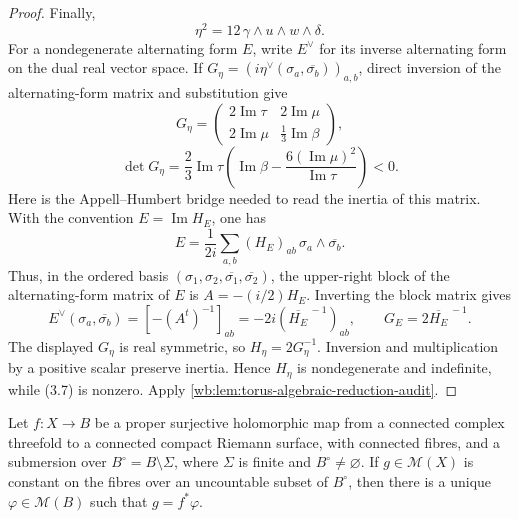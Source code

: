 \begin{proof}
Finally,
\[
 \eta^2=12\,\gamma\wedge u\wedge w\wedge\delta.
\tag{3.7}
\]
For a nondegenerate alternating form \(E\), write \(E^\vee\) for its
inverse alternating form on the dual real vector space.  If
\(G_\eta=(i\eta^\vee(\sigma_a,\overline{\sigma_b}))_{a,b}\), direct
inversion of the alternating-form matrix and substitution give
\[
G_\eta=
\begin{pmatrix}
2\operatorname{Im}\tau&2\operatorname{Im}\mu\\
2\operatorname{Im}\mu&\frac13\operatorname{Im}\beta
\end{pmatrix},
\]
\[
\det G_\eta=
\frac23\operatorname{Im}\tau
\left(\operatorname{Im}\beta-
\frac{6(\operatorname{Im}\mu)^2}{\operatorname{Im}\tau}\right)<0.
\tag{3.8}
\]
Here is the Appell--Humbert bridge needed to read the inertia of this
matrix.  With the convention \(E=\operatorname{Im}H_E\), one has
\[
 E=\frac1{2i}\sum_{a,b}(H_E)_{ab}\,
       \sigma_a\wedge\overline{\sigma_b}.
\]
Thus, in the ordered basis
\((\sigma_1,\sigma_2,\overline{\sigma_1},\overline{\sigma_2})\), the
upper-right block of the alternating-form matrix of \(E\) is
\(A=-(i/2)H_E\).  Inverting the block matrix gives
\[
 E^\vee(\sigma_a,\overline{\sigma_b})
   =[-(A^t)^{-1}]_{ab}
   =-2i(\overline{H_E}^{\,-1})_{ab},
 \qquad
 G_E=2\overline{H_E}^{\,-1}.
\tag{3.8a}
\]
The displayed \(G_\eta\) is real symmetric, so
\(H_\eta=2G_\eta^{-1}\).  Inversion and multiplication by a positive scalar
preserve inertia.  Hence \(H_\eta\) is nondegenerate and indefinite, while
(3.7) is nonzero.
Apply \cref{wb:lem:torus-algebraic-reduction-audit}.
\end{proof}

\begin{lemma}
\label{wb:lem:meromorphic-descent-audit}
Let \(f:X\to B\) be a proper surjective holomorphic map from a connected
complex threefold to a connected compact Riemann surface, with connected
fibres, and a submersion over
\(B^\circ=B\setminus\Sigma\), where \(\Sigma\) is finite and
\(B^\circ\ne\varnothing\).  If
\(g\in\mathcal M(X)\) is constant on the fibres over an uncountable subset
of \(B^\circ\), then there is a unique \(\varphi\in\mathcal M(B)\) such that
\(g=f^*\varphi\).
\end{lemma}

